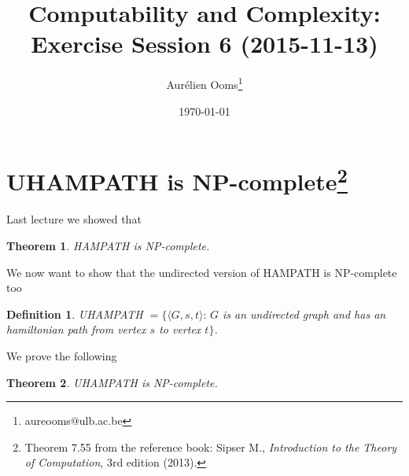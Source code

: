 \documentclass{article}
\title{Computability and Complexity:\\Exercise Session 6 (2015-11-13)}
\author{Aurélien Ooms\footnote{aureooms@ulb.ac.be}}
\date{\today}
\newcommand{\theoremname}{Theorem}
\newcommand{\definitionname}{Definition}
\newtheorem{theorem}{\theoremname}
\newtheorem{definition}{\definitionname}
\newcommand{\st}{\colon\,}
\begin{document}
\maketitle
\tableofcontents

\section{\texorpdfstring{UHAMPATH is NP-complete\footnote{%
Theorem 7.55 from the reference book: Sipser M.,
\emph{Introduction to the Theory of Computation}, 3rd edition
(2013).}}{UHAMPATH is NP-complete}}

Last lecture we showed that
\begin{theorem}
	HAMPATH is NP-complete.
\end{theorem}
We now want to show that the undirected version of HAMPATH is NP-complete too
\begin{definition}
	UHAMPATH \(= \{\langle G, s, t\rangle \st G\) is an undirected
				graph and has an hamiltonian path from vertex \(s\) to vertex
	\(t\}\).
\end{definition}
We prove the following
\begin{theorem}
	UHAMPATH is NP-complete.
\end{theorem}
\end{document}

